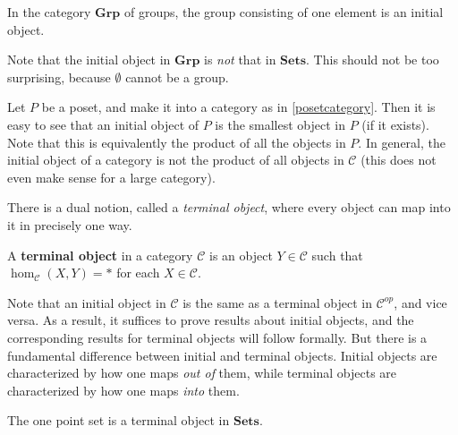 \begin{example} 
In the category $\mathbf{Grp}$ of groups, the group consisting of one element
is an initial object.
\end{example} 

Note that the initial object in $\mathbf{Grp}$ is \emph{not} that in
$\mathbf{Sets}$. This should not be too surprising, because $\emptyset$ cannot
be a group.

\begin{example} 
Let $P$ be a poset, and make it into a category as in \cref{posetcategory}.
Then it is easy to see that an initial object of $P$ is the smallest object in
$P$ (if it exists). Note that this is equivalently the product of all the
objects in $P$. In general, the initial object of a category is not the product
of all objects in $\mathcal{C}$ (this does not even make sense for a large
category).
\end{example} 

There is a dual notion, called a \textit{terminal object}, where every object
can map into it in precisely one way.
\begin{definition}
A \textbf{terminal object} in a category $\mathcal{C}$ is an object $Y \in
\mathcal{C}$ such that $\hom_{\mathcal{C}}(X, Y) = \ast$ for each $X \in \mathcal{C}$.
\end{definition}

Note that an initial object in $\mathcal{C}$ is the same as a terminal object
in $\mathcal{C}^{op}$, and vice versa. As a result, it suffices to prove 
results about initial objects, and the corresponding results for terminal
objects will follow formally.
But there is a fundamental difference between initial and terminal objects.
Initial objects are characterized by how one maps \emph{out of} them, while
terminal objects are characterized by how one maps \emph{into} them. 
\begin{example}
The one point set is a terminal object in $\mathbf{Sets}$.
\end{example}



